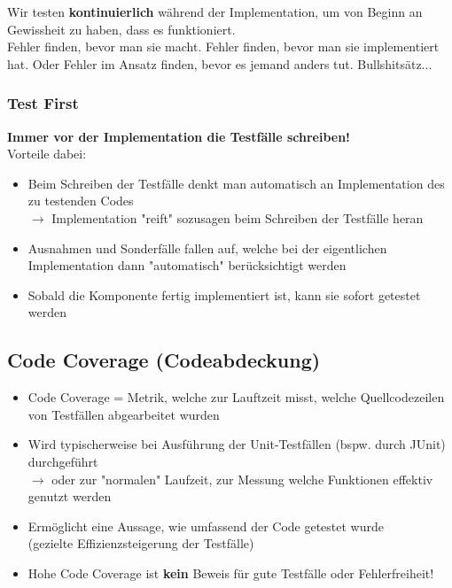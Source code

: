 \documentclass[a4paper]{article}
\begin{document}
		Wir testen \textbf{kontinuierlich} während der Implementation, um von Beginn an Gewissheit zu haben, dass es funktioniert.\\
		Fehler finden, bevor man sie macht.
		Fehler finden, bevor man sie implementiert hat.
		Oder Fehler im Ansatz finden, bevor es jemand anders tut.
		Bullshitsätz...
		
			\subsubsection{Test First}
			
			\textbf{Immer vor der Implementation die Testfälle schreiben!}\\
			Vorteile dabei:
			\begin{itemize}
				\item Beim Schreiben der Testfälle denkt man automatisch an Implementation des zu testenden Codes\\
				$\rightarrow$ Implementation "reift" sozusagen beim Schreiben der Testfälle heran
				
				\item Ausnahmen und Sonderfälle fallen auf, welche bei der eigentlichen Implementation dann "automatisch" berücksichtigt werden
				
				\item Sobald die Komponente fertig implementiert ist, kann sie sofort getestet werden
			\end{itemize}
		
		\subsection{Code Coverage (Codeabdeckung)}
		
		\begin{itemize}
			\item Code Coverage = Metrik, welche zur Lauftzeit misst, welche Quellcodezeilen von Testfällen abgearbeitet wurden
			\item Wird typischerweise bei Ausführung der Unit-Testfällen (bspw. durch JUnit) durchgeführt\\
				$\rightarrow$ oder zur "normalen" Laufzeit, zur Messung welche Funktionen effektiv genutzt werden
			\item Ermöglicht eine Aussage, wie umfassend der Code getestet wurde\\
			(gezielte Effizienzsteigerung der Testfälle)
			\item Hohe Code Coverage ist \textbf{kein} Beweis für gute Testfälle oder Fehlerfreiheit!
		\end{itemize}
	
\end{document}
